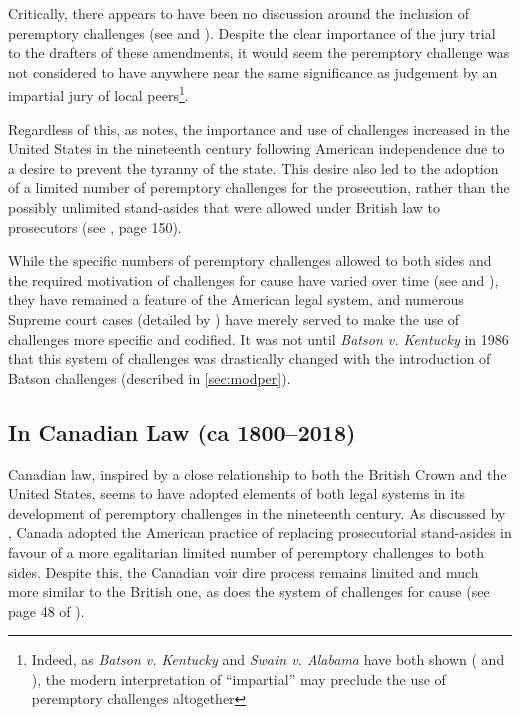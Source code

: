 Critically, there appears to have been no discussion around the inclusion of peremptory challenges (see \cite{hansvidjudging} and
\cite{hoffman1997}). Despite the clear importance of the jury trial to the drafters of these amendments, it would seem the
peremptory challenge was not considered to have anywhere near the same significance as judgement by an impartial jury of local
peers\footnote{Indeed, as \textit{Batson v. Kentucky} and \textit{Swain v. Alabama} have both shown (\cite{batsonvkentucky} and
  \cite{swainvalabama}), the modern interpretation of ``impartial'' may preclude the use of peremptory challenges
  altogether}.

Regardless of this, as \cite{brown2000} notes, the importance and use of challenges increased in the United States in the
nineteenth century following American independence due to a desire to prevent the tyranny of the state. This desire also led to
the adoption of a limited number of peremptory challenges for the prosecution, rather than the possibly unlimited stand-asides
that were allowed under British law to prosecutors (see \cite{vandykejurysel}, page 150).

While the specific numbers of peremptory challenges allowed to both sides and the required motivation of challenges for cause have
varied over time (see \cite{hoffman1997} and \cite{brown2000}), they have remained a feature of the American legal system, and
numerous Supreme court cases (detailed by \cite{hoffman1997}) have merely served to make the use of challenges more specific and
codified. It was not until \textit{Batson v. Kentucky} in 1986 that this system of challenges was drastically changed with the
introduction of Batson challenges (described in \ref{sec:modper}).

\subsection{In Canadian Law (ca 1800--2018)}

Canadian law, inspired by a close relationship to both the British Crown and the United States, seems to have adopted elements of
both legal systems in its development of peremptory challenges in the nineteenth century. As discussed by \cite{brown2000}, Canada
adopted the American practice of replacing prosecutorial stand-asides in favour of a more egalitarian limited number of peremptory
challenges to both sides. Despite this, the Canadian voir dire process remains limited and much more similar to the British one,
as does the system of challenges for cause (see page 48 of \cite{hansvidjudging}).

